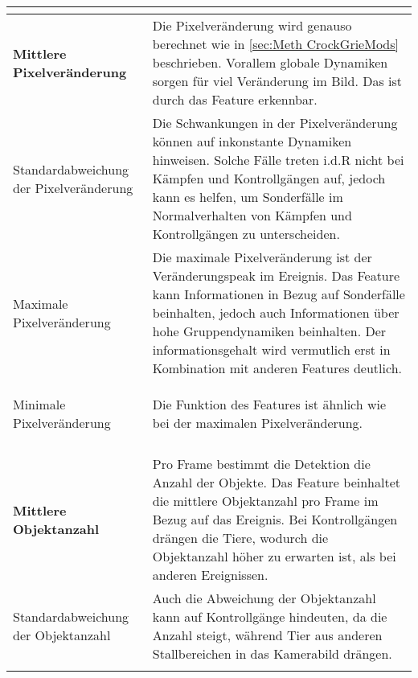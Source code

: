 \begin{longtable}{>{\bfseries}p{} p{}}
\hline
\multicolumn{2}{>{\bfseries}l}{Features der Videos} \\
\hline
Mittlere Pixelveränderung & Die Pixelveränderung wird genauso berechnet wie in \ref{sec:Meth CrockGrieMods} beschrieben. Vorallem globale Dynamiken sorgen für viel Veränderung im Bild. Das ist durch das Feature erkennbar.\\
\addlinespace[0.7em] %

Standardabweichung der Pixelveränderung & Die Schwankungen in der Pixelveränderung können auf inkonstante Dynamiken hinweisen. Solche Fälle treten i.d.R nicht bei Kämpfen und Kontrollgängen auf, jedoch kann es helfen, um Sonderfälle im Normalverhalten von Kämpfen und Kontrollgängen zu unterscheiden. \\
\addlinespace[0.7em] %

Maximale Pixelveränderung & Die maximale Pixelveränderung ist der Veränderungspeak im Ereignis. Das Feature kann Informationen in Bezug auf Sonderfälle beinhalten, jedoch auch Informationen über hohe Gruppendynamiken beinhalten. Der informationsgehalt wird vermutlich erst in Kombination mit anderen Features deutlich.\\
\addlinespace[0.7em] %

Minimale Pixelveränderung & Die Funktion des Features ist ähnlich wie bei der maximalen Pixelveränderung. \\
\addlinespace[0.7em] %


\hline
\multicolumn{2}{>{\bfseries}l}{Features der Detektionen} \\
\hline
Mittlere Objektanzahl & Pro Frame bestimmt die Detektion die Anzahl der Objekte. Das Feature beinhaltet die mittlere Objektanzahl pro Frame im Bezug auf das Ereignis. Bei Kontrollgängen drängen die Tiere, wodurch die Objektanzahl höher zu erwarten ist, als bei anderen Ereignissen. \\
\addlinespace[0.7em] %

Standardabweichung der Objektanzahl & Auch die Abweichung der Objektanzahl kann auf Kontrollgänge hindeuten, da die Anzahl steigt, während Tier aus anderen Stallbereichen in das Kamerabild drängen. \\
\addlinespace[0.7em] %


\end{longtable}
